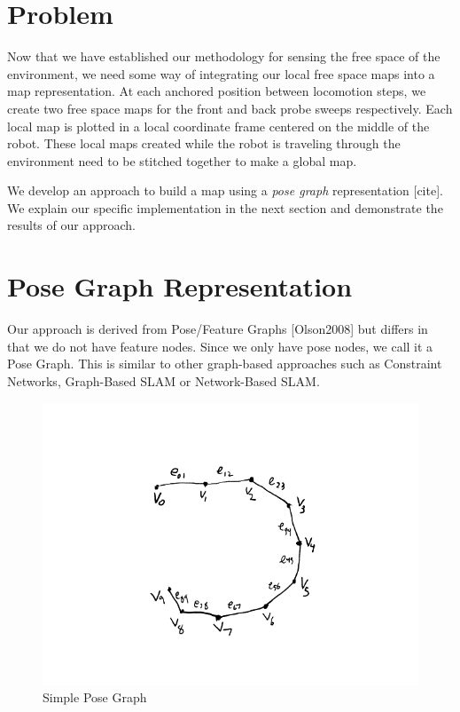 
\section{Problem}

Now that we have established our methodology for sensing the free space of the environment, we need some way of integrating our local free space maps into a map representation.  At each anchored position between locomotion steps, we create two free space maps for the front and back probe sweeps respectively.  Each local map is plotted in a local coordinate frame centered on the middle of the robot.  These local maps created while the robot is traveling through the environment need to be stitched together to make a global map.

We develop an approach to build a map using a \emph{pose graph} representation [cite].  We explain our specific implementation in the next section and demonstrate the results of our approach.

\section{Pose Graph Representation}

Our approach is derived from Pose/Feature Graphs [Olson2008] but differs in that we do not have feature nodes.  Since we only have pose nodes, we call it a Pose Graph.  This is similar to other graph-based approaches such as Constraint Networks, Graph-Based SLAM or Network-Based SLAM.

\begin{figure}
  \begin{center}
    \includegraphics[scale=0.7]{5_pose_graph_basic.png}
  \end{center}
  \caption{Simple Pose Graph}
  \label{fig:simple_pose_graph}
\end{figure}

